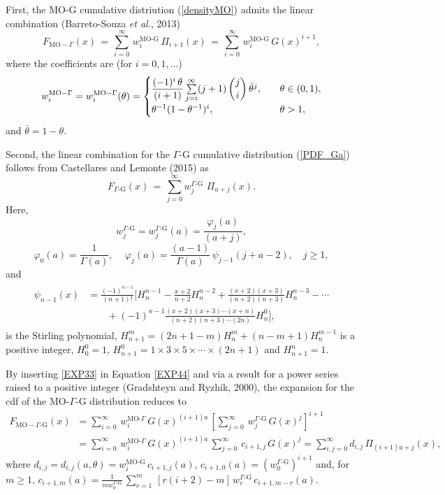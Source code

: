 \documentclass[twoside,leqno,11pt]{article}
\begin{document}
First, the MO-G cumulative distriution (\ref{densityMO}) admits the
linear combination (Barreto-Souza \emph{et al.}, 2013)
\begin{equation}
F_{\text{MO}-\Gamma}(x)
\,=\,
\sum^{\infty}_{i=0}\,w_i^{\text{MO-G}}\,\Pi_{i+1}(x)\,=\,\sum^{\infty}_{i=0}\,w_i^{\text{MO-G}}\,G(x)^{i+1},
\label{EXP44}
\end{equation}
where the coefficients are (for $i=0,1,\ldots$)
\[
w_i^{\text{MO}-\Gamma}=w_i^{\text{MO}-\Gamma}(\theta) =
\begin{cases}
\dfrac{(-1)^i\,\theta}{(i+1)} \sum\limits^{\infty}_{j=i}(j+1)\,\dbinom{j}{i}\,\bar{\theta}^j,& \quad \theta\in (0,1),\\
\theta^{-1} (1-\theta^{-1})^i,& \quad \theta>1,
\end{cases}
\]
and $\bar{\theta}=1-\theta$.


Second, the linear combination for the $\Gamma\text{-G}$ cumulative distribution (\ref{PDF_Ga}) follows from Castellares and Lemonte (2015) as
\begin{equation}\label{EXP33}
F_{\Gamma\text{-G}}(x)\,=\,\sum_{j=0}^\infty w_{j}^{\Gamma\text{-G}}\,\,\Pi_{a+j}(x).
\end{equation}
Here,
$$w_j^{\Gamma\text{-G}}=w_j^{\Gamma\text{-G}}(a)=\frac{\varphi_{j}(a)}{(a+j)},$$
\begin{equation*}\label{coeficientes}
\varphi_0(a)=\frac{1}{\Gamma(a)},
\quad\,
\varphi_j(a)=\frac{(a-1)}{\Gamma(a)}\,\psi_{j-1}(j+a-2),\quad j\geq 1,
\end{equation*}
and
\begin{align*}\label{polinomios_ward}
\begin{split}
\psi_{n-1}(x)&=\frac{(-1)^{n-1}}{(n+1)!}\Biggl[H^{n-1}_{n}-\frac{x+2}{n+2}H^{n-2}_{n}
+ \frac{(x+2)(x+3)}{(n+2)(n+3)}H^{n-3}_{n}- \cdots\\
&\qquad+ (-1)^{n-1}\frac{(x+2)(x+3)\cdots(x+n)}{(n+2)(n+3)\cdots(2n)}H^{0}_{n}\Biggr],
\end{split}
\end{align*}
is the Stirling polynomial, $H^{m}_{n+1}=(2n+1-m)H^{m}_{n} + (n-m+1)H^{m-1}_{n}$ is a positive integer,
$H^0_0=1$, $H^{0}_{n+1}=1\times 3\times 5\times\cdots\times(2n+1)$ and $H^{n}_{n+1}=1$.

By inserting \eqref{EXP33} in Equation \eqref{EXP44} and via a result for a power series raised to a positive integer (Gradshteyn and
Ryzhik, 2000), the expansion for the cdf of the MO-$\Gamma$-G distribution reduces to
\begin{align*}
F_{\text{MO}-\Gamma\text{-G}}(x)&=\sum_{i=0}^{\infty}\,w_{i}^{\text{MO-}\Gamma}\,G(x)^{(i+1)a}\,\left[\sum_{j=0}^{\infty}\,w_{j}^{\Gamma\text{-G}}\,G(x)^{j}\right]^{i+1}\\
&=\sum_{i=0}^{\infty}\,w_{i}^{\text{MO-}\Gamma}\,G(x)^{(i+1)a}\,\sum_{j=0}^{\infty}\,c_{i+1,j}\,G(x)^{j} =\sum_{i,j=0}^\infty d_{i,j}\,\Pi_{(i+1)a+j}(x),
\end{align*}
where $d_{i,j}=d_{i,j}(a,\theta)=w_{i}^{\text{MO-G}}\,c_{i+1,j}(a)$, $c_{i+1,0}(a)=(w_{0}^{\Gamma\text{-G}})^{i+1}$ and, for $m \ge 1$,
$c_{i+1,m}(a)=\frac{1}{m w_{0}^{\Gamma\text{-G}}}\,\sum^{m}_{r=1}\,\left[r(i+2)-m\right]\,w_{r}^{\Gamma\text{-G}}\,c_{i+1,m-r}(a)$.
\end{document}
